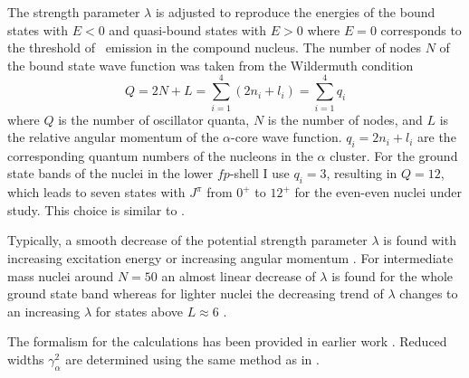 The strength parameter $\lambda$ is adjusted to reproduce the energies of the
bound states with $E < 0$ and quasi-bound states with $E > 0$ where $E = 0$
corresponds to the threshold of \al\ emission in the compound
nucleus. The number of nodes $N$ of the bound state
wave function was taken from the Wildermuth condition
%
\begin{equation}
Q = 2N + L = \sum_{i=1}^4 (2n_i + l_i) = \sum_{i=1}^4 q_i
\label{eq:wild}
\end{equation}
%
where $Q$ is the number of oscillator quanta, $N$ is the number of nodes, and
$L$ is the relative angular momentum of the $\alpha$-core wave function. $q_i
= 2n_i + l_i$ are the corresponding quantum numbers of the nucleons in the
$\alpha$ cluster. For the ground state bands of the nuclei in the lower
$fp$-shell I use $q_i = 3$, resulting in $Q = 12$, which leads to seven states
with $J^\pi$ from $0^+$ to $12^+$ for the even-even nuclei under study. This
choice is similar to \SM .

Typically, a smooth decrease of the potential strength parameter
$\lambda$ is found with increasing excitation energy or increasing angular
momentum \cite{Abe93,Mohr08}. For intermediate mass nuclei around $N = 50$ an
almost linear decrease of $\lambda$ is found for the whole ground state band
\cite{Mohr08} whereas for lighter nuclei the decreasing trend of $\lambda$
changes to an increasing $\lambda$ for states above $L \approx 6$
\cite{Abe93}.

The formalism for the calculations has been provided in earlier work
\cite{Abe93,Atz96,Mohr07,Mohr08}. Reduced widths $\gamma_\alpha^2$ are
determined using the same method as in \SM .


